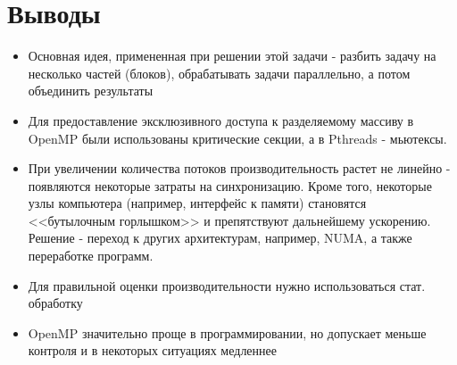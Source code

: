 \section{Выводы}
\begin{itemize}
	\item Основная идея, примененная при решении этой задачи - разбить задачу на несколько частей (блоков), обрабатывать задачи параллельно, а потом объединить результаты
	\item Для предоставление эксклюзивного доступа к разделяемому массиву в OpenMP были использованы критические секции, а в Pthreads - мьютексы.
	\item При увеличении количества потоков производительность растет не линейно - появляются некоторые затраты на синхронизацию. Кроме того, некоторые узлы компьютера (например, интерфейс к памяти) становятся <<бутылочным горлышком>> и препятствуют дальнейшему ускорению. Решение - переход к других архитектурам, например, NUMA, а также переработке программ.
	\item Для правильной оценки производительности нужно использоваться стат. обработку
	\item OpenMP значительно проще в программировании, но допускает меньше контроля и в некоторых ситуациях медленнее
\end{itemize}
